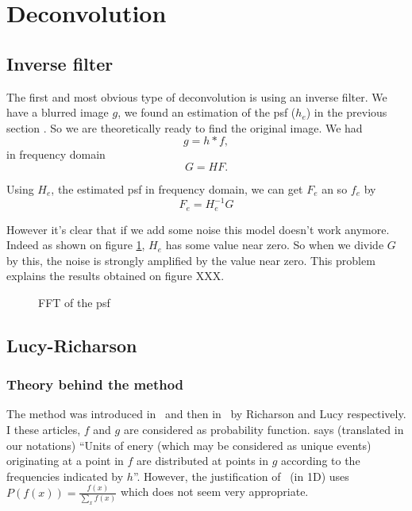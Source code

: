 \section{Deconvolution}
\subsection{Inverse filter}
The first and most obvious type of deconvolution is using an inverse filter. We have a blurred image $g$, we found an estimation of the psf ($h_e$) in the previous section %
. So we are theoretically ready to find the original image. We had
\begin{equation}
 g =  h*f,
\end{equation}
in frequency domain
\begin{equation}
G = HF. 
\end{equation}

Using $H_e$, the estimated psf in frequency domain, we can get $F_e$ an so $f_e$ by 
\begin{equation}
F_{e} = H_{e}^{-1} G
\end{equation} 

However it's clear that if we add some noise this model doesn't work anymore. Indeed as shown on figure \ref{fig:psfFFT}, $H_e$ has some value near zero. So when we divide $G$ by this, the noise is strongly amplified by the value near zero. This problem explains the results obtained on figure XXX. %

\begin{figure}
\centering
{}
\caption{FFT of the psf}
\label{fig:psfFFT}
\end{figure}


\subsection{Lucy-Richarson}
\subsubsection{Theory behind the method}
The method was introduced in~\cite{richardson1972bayesian} and
then in~\cite{lucy1974iterative} by Richarson and Lucy respectively.
I these articles, $f$ and $g$ are considered as probability function.
\cite{richardson1972bayesian} says (translated in our notations)
``Units of enery (which may be considered as unique events)
originating at a point in $f$ are distributed at points in $g$
according to the frequencies indicated by $h$''.
However, the justification of~\cite{richardson1972bayesian} (in 1D) uses
$P(f(x)) = \frac{f(x)}{\sum_x f(x)}$ which does not seem
very appropriate.

